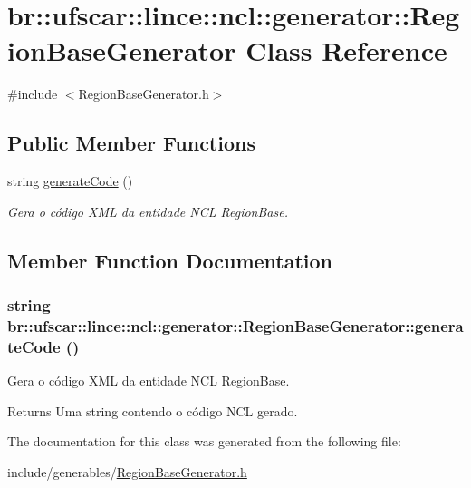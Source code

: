 \hypertarget{classbr_1_1ufscar_1_1lince_1_1ncl_1_1generator_1_1RegionBaseGenerator}{
\section{br::ufscar::lince::ncl::generator::RegionBaseGenerator Class Reference}
\label{classbr_1_1ufscar_1_1lince_1_1ncl_1_1generator_1_1RegionBaseGenerator}
}


{\ttfamily \#include $<$RegionBaseGenerator.h$>$}

\subsection*{Public Member Functions}
\begin{DoxyCompactItemize}
\item 
string \hyperlink{classbr_1_1ufscar_1_1lince_1_1ncl_1_1generator_1_1RegionBaseGenerator_a5cacb63a0e16b839d03d0e8cd0101541}{generateCode} ()
\begin{DoxyCompactList}\small\item\em Gera o código XML da entidade NCL RegionBase. \item\end{DoxyCompactList}\end{DoxyCompactItemize}


\subsection{Member Function Documentation}
\hypertarget{classbr_1_1ufscar_1_1lince_1_1ncl_1_1generator_1_1RegionBaseGenerator_a5cacb63a0e16b839d03d0e8cd0101541}{
\subsubsection[{generateCode}]{\setlength{\rightskip}{0pt plus 5cm}string br::ufscar::lince::ncl::generator::RegionBaseGenerator::generateCode ()}}
\label{classbr_1_1ufscar_1_1lince_1_1ncl_1_1generator_1_1RegionBaseGenerator_a5cacb63a0e16b839d03d0e8cd0101541}


Gera o código XML da entidade NCL RegionBase. 

\begin{DoxyReturn}{Returns}
Uma string contendo o código NCL gerado. 
\end{DoxyReturn}


The documentation for this class was generated from the following file:\begin{DoxyCompactItemize}
\item 
include/generables/\hyperlink{RegionBaseGenerator_8h}{RegionBaseGenerator.h}\end{DoxyCompactItemize}
